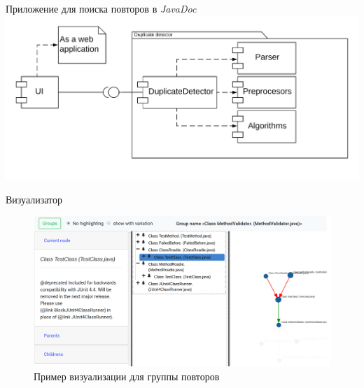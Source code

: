 \documentclass[xcolor=table]{beamer}
\begin{document}
\begin{frame}{Приложение для поиска повторов в \emph{JavaDoc}}
\includegraphics[width=1.0\textwidth]{pictures/arhitecture.png}
\end{frame}




\begin{frame}{Визуализатор}

\begin{figure}
    \centering
 \includegraphics[width=1.0\textwidth]{pictures/exampleViz.png}
 \caption{Пример визуализации для группы повторов}
 \end{figure}
\end{frame}
\end{document}
